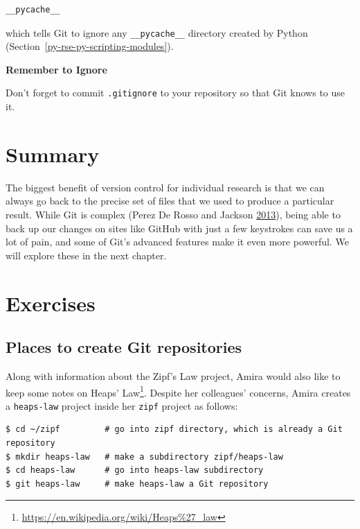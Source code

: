 \documentclass[
]{krantz}
\renewenvironment{quote}{\begin{VF}}{\end{VF}}
\renewcommand{\href}[2]{#2\footnote{\url{#1}}}
\begin{document}
\begin{verbatim}
__pycache__
\end{verbatim}

which tells Git to ignore any \texttt{\_\_pycache\_\_} directory created by Python
(Section~\ref{py-rse-py-scripting-modules}).

\begin{quote}
\textbf{Remember to Ignore}

Don't forget to commit \texttt{.gitignore} to your repository
so that Git knows to use it.
\end{quote}

\hypertarget{git-cmdline-summary}{%
\section{Summary}\label{git-cmdline-summary}}

The biggest benefit of version control for individual research is that
we can always go back to the precise set of files
that we used to produce a particular result.
While Git is complex (Perez De Rosso and Jackson \protect\hyperlink{ref-Pere2013}{2013}),
being able to back up our changes on sites like GitHub
with just a few keystrokes can save us a lot of pain,
and some of Git's advanced features make it even more powerful.
We will explore these in the next chapter.

\hypertarget{git-cmdline-exercises}{%
\section{Exercises}\label{git-cmdline-exercises}}

\hypertarget{git-cmdline-ex-places}{%
\subsection{Places to create Git repositories}\label{git-cmdline-ex-places}}

Along with information about the Zipf's Law project,
Amira would also like to keep some notes on \href{https://en.wikipedia.org/wiki/Heaps\%27_law}{Heaps' Law}.
Despite her colleagues' concerns,
Amira creates a \texttt{heaps-law} project inside her \texttt{zipf} project as follows:

\begin{verbatim}
$ cd ~/zipf         # go into zipf directory, which is already a Git repository
$ mkdir heaps-law   # make a subdirectory zipf/heaps-law
$ cd heaps-law      # go into heaps-law subdirectory
$ git heaps-law     # make heaps-law a Git repository
\end{verbatim}
\end{document}
